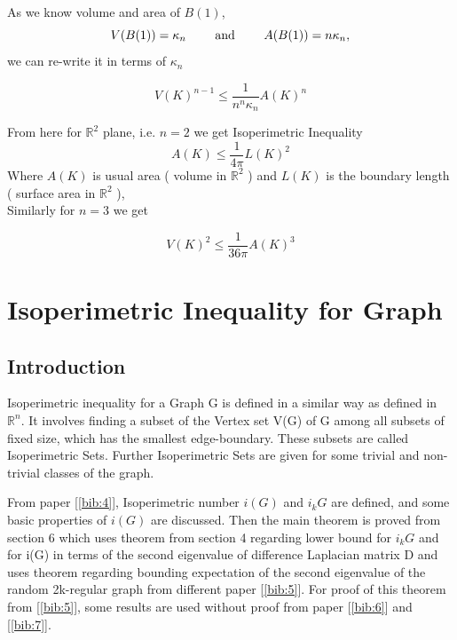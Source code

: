 \documentclass[oneside]{book}
\begin{document}
	As we know volume and area of $B(1)$, 
	$$V(B(1))=\kappa_{n} \text{  \quad \quad and \quad \quad   } A(B(1))=n \kappa_{n},$$
	we can re-write it  in terms of $\kappa_{n}$
	
	\[
	V(K)^{n-1} \leq \frac{1}{n^{n} \kappa_{n}} A(K)^{n}
	\]
	\hfill \break
	
	From here for $\mathbb{R}^{2}$ plane, i.e. $n=2$ we get Isoperimetric Inequality  
	\[
	A(K) \leq \frac{1}{4 \pi} L(K)^{2}
	\]
	Where  $A(K)$ is usual  area ( volume in $\mathbb{R}^{2}$ ) and $L(K)$ is the boundary length \newline  ( surface area in $\mathbb{R}^{2}$ ), \\
	
	Similarly  for $n=3$
	we get
	
	\[
	V(K)^{2} \leq \frac{1}{36 \pi} A(K)^{3}
	\]
	
	
	
	
	
	
	
	
	
	
	
	
	
	
	
	
	
	
	
	
	
	
	
	
	
	
	
	
	
	
	
	
	
	
	
	
	\chapter{Isoperimetric Inequality for Graph}
	\label{chap:c5}
	\section{Introduction}
	\label{s:5}
	
	Isoperimetric inequality for a Graph G is defined in a similar way as defined in $\mathbb{R}^n$. It involves finding a subset of the Vertex set V(G) of G among all subsets of fixed size, which has the smallest edge-boundary. These subsets are called Isoperimetric Sets. Further  Isoperimetric Sets are given for some trivial and non-trivial classes of the graph. \par 
	From paper [\ref{bib:4}], Isoperimetric number $i(G)$ and $i_k{G}$ are defined, and some basic properties of $i(G)$  are discussed. Then the main theorem  is proved from section 6 which uses theorem from section 4 regarding lower bound for $i_k{G}$ and for i(G) in terms of the second eigenvalue of difference Laplacian matrix D and uses theorem regarding bounding expectation of the second eigenvalue of the random 2k-regular graph from different paper [\ref{bib:5}]. For proof of this theorem from [\ref{bib:5}], some results are used without proof from paper [\ref{bib:6}] and [\ref{bib:7}].
	
\end{document}
